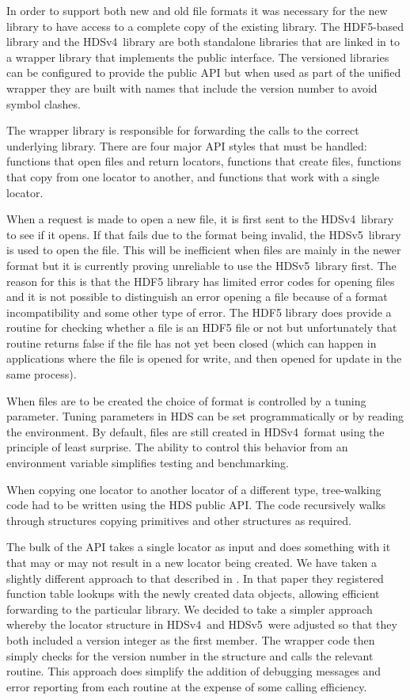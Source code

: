 \documentclass[final,authoryear,5p,times,twocolumn]{elsarticle}
\newcommand{\new}{HDSv5}
\newcommand{\old}{HDSv4}
\begin{document}
In order to support both new and old file formats it was necessary for
the new library to have access to a complete copy of the existing
library. The HDF5-based library and the \old\ library are both
standalone libraries that are linked in to a wrapper library that
implements the public interface. The versioned libraries can be
configured to provide the public API but when used as part of the
unified wrapper they are built with names that include the version
number to avoid symbol clashes.

The wrapper library is responsible for forwarding the calls to the
correct underlying library. There are four major API styles that must
be handled: functions that open files and return locators, functions
that create files, functions that copy from one locator to another,
and functions that work with a single locator.

When a request is made to open a new file, it is first sent to the
\old\ library to see if it opens. If that fails due to the format
being invalid, the \new\ library is used to open the file. This will be
inefficient when files are mainly in the newer format but it is
currently proving unreliable to use the \new\ library first. The
reason for this is that the HDF5 library has limited error codes for
opening files and it is not possible to distinguish an error opening a
file because of a format incompatibility and some other type of
error. The HDF5 library does provide a routine for checking whether a
file is an HDF5 file or not but unfortunately that routine returns
false if the file has not yet been closed (which can happen in
applications where the file is opened for write, and then opened for
update in the same process).

When files are to be created the choice of format is controlled by a
tuning parameter. Tuning parameters in HDS can be set programmatically
or by reading the environment. By default, files are still created in
\old\ format using the principle of least surprise. The ability to
control this behavior from an environment variable simplifies testing
and benchmarking.

When copying one locator to another locator of a different type,
tree-walking code had to be written using the HDS public API. The code
recursively walks through structures copying primitives and other
structures as required.

The bulk of the API takes a single locator as input and does something
with it that may or may not result in a new locator being created. We
have taken a slightly different approach to that described in
\citet{2004Rew}. In that paper they registered function table lookups
with the newly created data objects, allowing efficient forwarding to
the particular library. We decided to take a simpler approach whereby
the locator structure in \old\ and \new\ were adjusted so that they
both included a version integer as the first member. The wrapper code
then simply checks for the version number in the structure and calls the
relevant routine. This approach does simplify the addition of
debugging messages and error reporting from each routine at the
expense of some calling efficiency.
\end{document}
